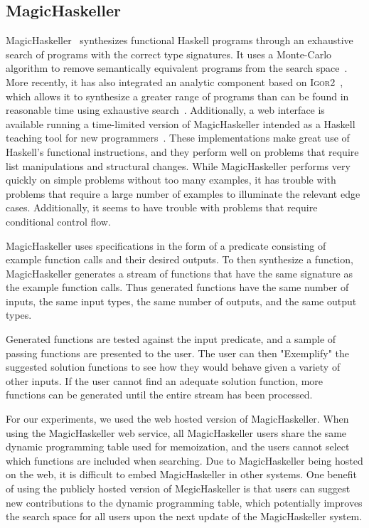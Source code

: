 \subsection{MagicHaskeller}

MagicHaskeller~\cite{katayama2010,Katayama05} synthesizes functional Haskell programs through an exhaustive search of programs with the correct type signatures. It uses a Monte-Carlo algorithm to remove semantically equivalent programs from the search space~\cite{Katayama2008}. More recently, it has also integrated an analytic component based on \textsc{Igor2}~\cite{kitzelmann2011two}, which allows it to synthesize a greater range of programs than can be found in reasonable time using exhaustive search~\cite{katayama2011magichaskeller}. Additionally, a web interface is available running a time-limited version of MagicHaskeller intended as a Haskell teaching tool for new programmers~\cite{katayama2013}. These implementations make great use of Haskell's functional instructions, and they perform well on problems that require list manipulations and structural changes. While MagicHaskeller performs very quickly on simple problems without too many examples, it has trouble with problems that require a large number of examples to illuminate the relevant edge cases. Additionally, it seems to have trouble with problems that require conditional control flow.

MagicHaskeller uses specifications in the form of a predicate consisting of example function calls and their desired outputs. To then synthesize a function, MagicHaskeller generates a stream of functions that have the same signature as the example function calls. Thus generated functions have the same number of inputs, the same input types, the same number of outputs, and the same output types.

Generated functions are tested against the input predicate, and a sample of passing functions are presented to the user. The user can then "Exemplify" the suggested solution functions to see how they would behave given a variety of other inputs. If the user cannot find an adequate solution function, more functions can be generated until the entire stream has been processed.

For our experiments, we used the web hosted version of MagicHaskeller. When using the MagicHaskeller web service, all MagicHaskeller users share the same dynamic programming table used for memoization, and the users cannot select which functions are included when searching. Due to MagicHaskeller being hosted on the web, it is difficult to embed MagicHaskeller in other systems. One benefit of using the publicly hosted version of MegicHaskeller is that users can suggest new contributions to the dynamic programming table, which potentially improves the search space for all users upon the next update of the MagicHaskeller system. 

